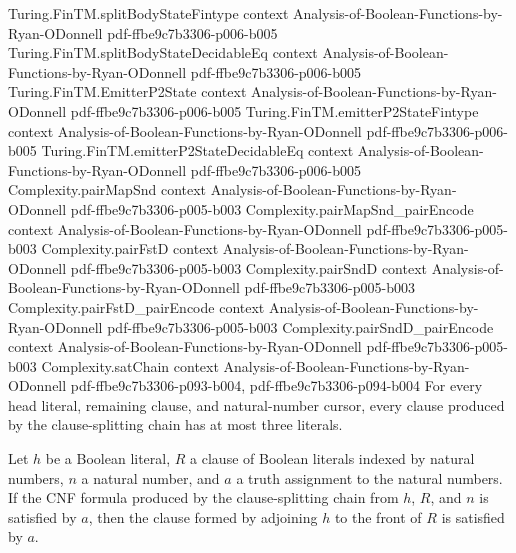 \begin{lemma}
\proofstep
  {Turing.FinTM.splitBodyStateFintype}
  {context}
  {Analysis-of-Boolean-Functions-by-Ryan-ODonnell}
  {pdf-ffbe9c7b3306-p006-b005}
\proofstep
  {Turing.FinTM.splitBodyStateDecidableEq}
  {context}
  {Analysis-of-Boolean-Functions-by-Ryan-ODonnell}
  {pdf-ffbe9c7b3306-p006-b005}
\proofstep
  {Turing.FinTM.EmitterP2State}
  {context}
  {Analysis-of-Boolean-Functions-by-Ryan-ODonnell}
  {pdf-ffbe9c7b3306-p006-b005}
\proofstep
  {Turing.FinTM.emitterP2StateFintype}
  {context}
  {Analysis-of-Boolean-Functions-by-Ryan-ODonnell}
  {pdf-ffbe9c7b3306-p006-b005}
\proofstep
  {Turing.FinTM.emitterP2StateDecidableEq}
  {context}
  {Analysis-of-Boolean-Functions-by-Ryan-ODonnell}
  {pdf-ffbe9c7b3306-p006-b005}
\proofstep
  {Complexity.pairMapSnd}
  {context}
  {Analysis-of-Boolean-Functions-by-Ryan-ODonnell}
  {pdf-ffbe9c7b3306-p005-b003}
\proofstep
  {Complexity.pairMapSnd_pairEncode}
  {context}
  {Analysis-of-Boolean-Functions-by-Ryan-ODonnell}
  {pdf-ffbe9c7b3306-p005-b003}
\proofstep
  {Complexity.pairFstD}
  {context}
  {Analysis-of-Boolean-Functions-by-Ryan-ODonnell}
  {pdf-ffbe9c7b3306-p005-b003}
\proofstep
  {Complexity.pairSndD}
  {context}
  {Analysis-of-Boolean-Functions-by-Ryan-ODonnell}
  {pdf-ffbe9c7b3306-p005-b003}
\proofstep
  {Complexity.pairFstD_pairEncode}
  {context}
  {Analysis-of-Boolean-Functions-by-Ryan-ODonnell}
  {pdf-ffbe9c7b3306-p005-b003}
\proofstep
  {Complexity.pairSndD_pairEncode}
  {context}
  {Analysis-of-Boolean-Functions-by-Ryan-ODonnell}
  {pdf-ffbe9c7b3306-p005-b003}
\proofstep
  {Complexity.satChain}
  {context}
  {Analysis-of-Boolean-Functions-by-Ryan-ODonnell}
  {pdf-ffbe9c7b3306-p093-b004,
    pdf-ffbe9c7b3306-p094-b004}
For every head literal, remaining clause, and natural-number cursor, every clause
produced by the clause-splitting chain has at most three literals.
\end{lemma}

\begin{lemma}
\label{Complexity.satChain_sound}
\leanok
{}
Let $h$ be a Boolean literal, $R$ a clause of Boolean literals indexed by natural
numbers, $n$ a natural number, and $a$ a truth assignment to the natural numbers. If the
CNF formula produced by the clause-splitting chain from $h$, $R$, and $n$ is satisfied
by $a$, then the clause formed by adjoining $h$ to the front of $R$ is satisfied by $a$.
\end{lemma}

